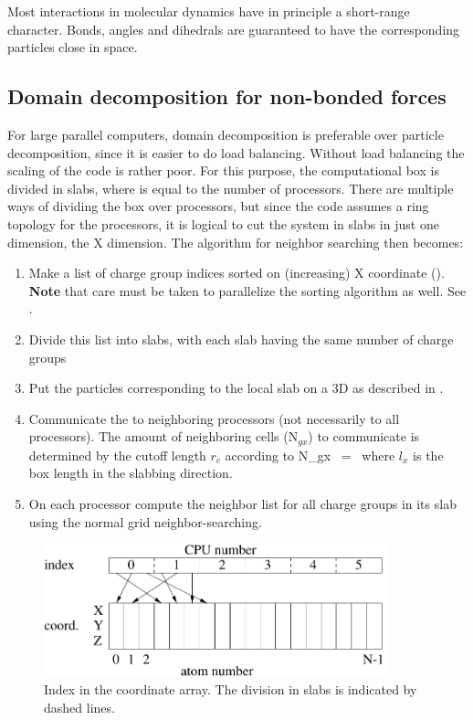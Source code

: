 Most interactions in molecular dynamics have in principle a
short-range character.  Bonds, angles and dihedrals are guaranteed to
have the corresponding particles close in space.


\subsection{Domain decomposition for non-bonded forces}
For large parallel computers, domain decomposition is preferable over
particle decomposition, since it is easier to do load
balancing. Without load balancing the scaling of the code is rather
poor. For this purpose, the computational box is divided in {\nproc}
slabs, where {\nproc} is equal to the number of processors. There are
multiple ways of dividing the box over processors, but since the
{\gromacs} code assumes a ring topology for the processors, it is
logical to cut the system in slabs in just one dimension, the X
dimension.  The algorithm for neighbor searching then becomes:
\begin{enumerate}
\item   Make a list of charge group indices sorted on (increasing) X coordinate
        ().
        {\bf Note} that care must be taken to parallelize the sorting algorithm
        as well. See .
\item   Divide this list into slabs, with each slab having the same number of
        charge groups
\item   Put the particles corresponding to the local slab on a 3D {\nsgrid} as 
        described in .
\item   Communicate the {\nsgrid} to neighboring processors (not necessarily to all
        processors). The amount of neighboring {\nsgrid} cells (N$_{gx}$) to 
        communicate is determined by the cutoff length $r_c$ according to
        \beq
        N_{gx}  ~=~        
        \eeq
        where $l_x$ is the box length in the slabbing direction. 
\item   On each processor compute the neighbor list for all charge groups in
        its slab using the normal grid neighbor-searching.
\end{enumerate}

\begin{figure}
\centerline{\includegraphics[width=10cm]{plots/parsort}}
\caption[Index in the coordinate array.]{Index in the coordinate
array. The division in slabs is indicated by dashed lines.}
\label{fig:parsort}
\end{figure}

